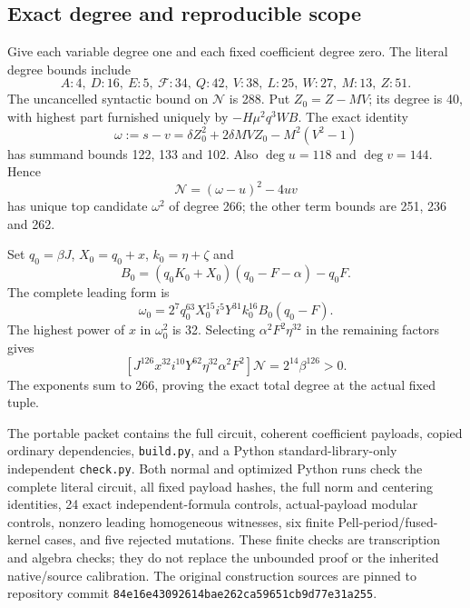 \subsection{Exact degree and reproducible scope}
Give each variable degree one and each fixed coefficient degree zero.
The literal degree bounds include
\[
 A:4,\ D:16,\ E:5,\ \mathcal F:34,\ Q:42,\ V:38,\ L:25,
 \ W:27,\ M:13,\ Z:51.
\]
The uncancelled syntactic bound on $\mathcal N$ is 288. Put $Z_0=Z-MV$;
its degree is 40, with highest part furnished uniquely by
$-H\mu^2q^3WB$. The exact identity
\[
 \omega:=s-v
  =\delta Z_0^2+2\delta MVZ_0-M^2(V^2-1)
\]
has summand bounds 122, 133 and 102. Also $\deg u=118$ and
$\deg v=144$. Hence
\[
 \mathcal N=(\omega-u)^2-4uv
\]
has unique top candidate $\omega^2$ of degree 266; the other term bounds
are 251, 236 and 262.

Set $q_0=\beta J$, $X_0=q_0+x$, $k_0=\eta+\zeta$ and
\[
 B_0=(q_0K_0+X_0)(q_0-F-\alpha)-q_0F.
\]
The complete leading form is
\[
 \omega_0=2^7q_0^{63}X_0^{15}i^5Y^{31}k_0^{16}B_0(q_0-F).
\]
The highest power of $x$ in $\omega_0^2$ is 32. Selecting
$\alpha^2F^2\eta^{32}$ in the remaining factors gives
\[
 [J^{126}x^{32}i^{10}Y^{62}\eta^{32}\alpha^2F^2]\mathcal N
                  =2^{14}\beta^{126}>0.
\]
The exponents sum to 266, proving the exact total degree at the actual
fixed tuple.

The portable packet contains the full circuit, coherent coefficient
payloads, copied ordinary dependencies, \texttt{build.py}, and a Python
standard-library-only independent \texttt{check.py}. Both normal and
optimized Python runs check the complete literal circuit, all fixed
payload hashes, the full norm and centering identities, 24 exact
independent-formula controls, actual-payload modular controls, nonzero
leading homogeneous witnesses, six finite Pell-period/fused-kernel cases,
and five rejected mutations. These finite checks are transcription and
algebra checks; they do not replace the unbounded proof or the inherited
native/source calibration. The original construction sources are pinned to repository commit
\texttt{84e16e43092614bae262ca59651cb9d77e31a255}.
